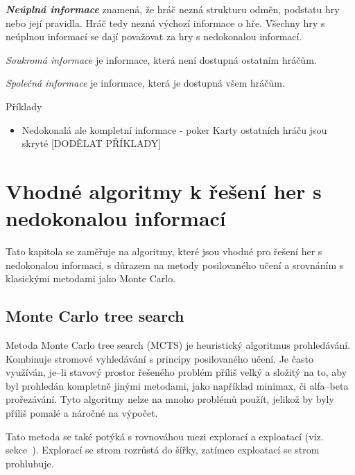 \textbf{\emph{Neúplná informace}} znamená, že hráč nezná strukturu odměn, podstatu hry nebo její pravidla.
Hráč tedy nezná výchozí informace o hře.
Všechny hry s neúplnou informací se dají považovat za hry s nedokonalou informací.

\emph{Soukromá informace} je informace, která není dostupná ostatním hráčům.

\emph{Společná informace} je informace, která je dostupná všem hráčům.

Příklady
\begin{itemize}
  \item Nedokonalá ale kompletní informace - poker
    Karty ostatních hráču jsou skryté
    {\color {red} [DODĚLAT PŘÍKLADY]}


\end{itemize}


\section{Vhodné algoritmy k řešení her s nedokonalou informací}\label{sec:vhodne-algoritmy-k-reseni-her-s-nedokonalou-informaci}

Tato kapitola se zaměřuje na algoritmy, které jsou vhodné pro řešení her s nedokonalou informací, s důrazem na metody posilovaného učení a srovnáním s klasickými metodami jako Monte Carlo.

\subsection{Monte Carlo tree search}\label{subsec:monte-carlo-tree-search}
Metoda Monte Carlo tree search (MCTS) je heuristický algoritmus prohledávání.
Kombinuje stromové vyhledávání s principy posilovaného učení.
Je často využíván, je--li stavový prostor řešeného problém příliš velký a složitý na to, aby byl prohledán kompletně jinými metodami, jako například minimax, či alfa--beta prořezávání.
Tyto  algoritmy nelze na mnoho problémů použít, jelikož by byly příliš pomalé a náročné na výpočet.

Tato metoda se také potýká s rovnováhou mezi explorací a exploatací (viz.~ sekce~).
Explorací se strom rozrůstá do šířky, zatímco exploatací se strom prohlubuje.

